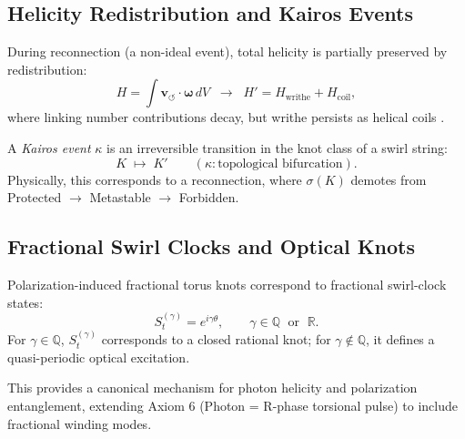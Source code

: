 \subsection{Helicity Redistribution and Kairos Events}

\begin{axiom}
    During reconnection (a non-ideal event), total helicity is partially preserved by redistribution:
    \[
        H = \int \mathbf{v}_{\!\boldsymbol{\circlearrowleft}} \cdot \boldsymbol{\omega}\, dV
        \;\;\longrightarrow\;\;
        H' = H_{\text{writhe}} + H_{\text{coil}} ,
    \]
    where linking number contributions decay, but writhe persists as helical coils \cite{Ricca1996,Kleckner2016}.
\end{axiom}

\begin{definition}
    A \emph{Kairos event} $\kappa$ is an irreversible transition in the knot class of a swirl string:
    \[
        K \;\mapsto\; K' \qquad (\kappa: \text{topological bifurcation}).
    \]
    Physically, this corresponds to a reconnection, where $\sigma(K)$ demotes from Protected $\to$ Metastable $\to$ Forbidden.
\end{definition}

\subsection{Fractional Swirl Clocks and Optical Knots}

\begin{theorem}
    Polarization-induced fractional torus knots correspond to fractional swirl-clock states:
    \[
        S_t^{(\gamma)} = e^{i \gamma \theta}, \qquad \gamma \in \mathbb{Q}\;\text{ or }\;\mathbb{R}.
    \]
    \]
    For $\gamma \in \mathbb{Q}$, $S_t^{(\gamma)}$ corresponds to a closed rational knot; for $\gamma \notin \mathbb{Q}$, it defines a quasi-periodic optical excitation.
\end{theorem}

This provides a canonical mechanism for photon helicity and polarization entanglement, extending Axiom 6 (Photon = R-phase torsional pulse) to include fractional winding modes.

